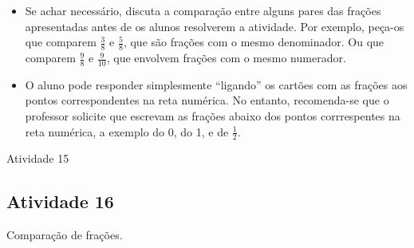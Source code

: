 \begin{multicols}{2}
\begin{itemize}
    \item       Se achar necessário, discuta a comparação entre alguns pares das frações apresentadas antes de os alunos resolverem a atividade. Por exemplo, peça-os que comparem       $\frac{3}{8}$        e       $\frac{5}{8}$, que são frações com o mesmo denominador. Ou que comparem       $\frac{9}{8}$       e       $\frac{9}{10}$, que envolvem frações com o mesmo numerador.
    \item       O aluno pode responder simplesmente       ``ligando''       os cartões com as frações aos pontos correspondentes na reta numérica. No entanto, recomenda-se que o professor solicite que escrevam as frações abaixo dos pontos corrrespentes na reta numérica, a exemplo do 0, do 1, e de       $\frac{1}{2}$.
\end{itemize} %
 
\begin{resposta*}{Atividade 15}

  
\end{resposta*}

\subsection{Atividade 16}

   Comparação de frações.


\end{multicols}
